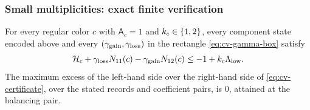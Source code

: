 \subsubsection{Small multiplicities: exact finite verification}

\begin{lemma}\label{lem:cv-certificate}
For every regular color \(c\) with
\(\mathsf A_c=1\) and \(k_c\in\left\{1,2\right\}\), every component state encoded
above and every $(\gamma_{\rm gain},\gamma_{\rm loss})$ in the rectangle
\eqref{eq:cv-gamma-box}
satisfy
\begin{equation}\label{eq:cv-certificate}
\mathcal H_c+\gamma_{\rm loss}N_{11}(c)
       -\gamma_{\rm gain}N_{12}(c)
 \le-1+k_c\Lambda_{\rm low}.
\end{equation}
The maximum excess of the left-hand side over the right-hand side of
\eqref{eq:cv-certificate}, over the stated records and coefficient pairs,
is $0$, attained at the balancing pair.
\end{lemma}

